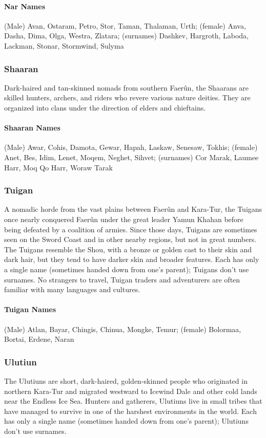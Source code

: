 \documentclass[10pt,a4paper,twoside,twocolumn,openany,bg=print,nodeprecatedcode]{dndbook}
\begin{document}
\paragraph{Nar Names}
(Male) Avan, Ostaram, Petro, Stor, Taman, Thalaman, Urth; (female) Anva, Dasha, Dima, Olga, Westra, Zlatara; (surnames) Dashkev, Hargroth, Laboda, Lackman, Stonar, Stormwind, Sulyma
\subsubsection{Shaaran}
Dark-haired and tan-skinned nomads from southern Faerûn, the Shaarans are skilled hunters, archers, and riders who revere various nature deities. They are organized into clans under the direction of elders and chieftains.
\paragraph{Shaaran Names}
(Male) Awar, Cohis, Damota, Gewar, Hapah, Laskaw, Senesaw, Tokhis; (female) Anet, Bes, Idim, Lenet, Moqem, Neghet, Sihvet; (surnames) Cor Marak, Laumee Harr, Moq Qo Harr, Woraw Tarak
\subsubsection{Tuigan}
A nomadic horde from the vast plains between Faerûn and Kara-Tur, the Tuigans once nearly conquered Faerûn under the great leader Yamun Khahan before being defeated by a coalition of armies. Since those days, Tuigans are sometimes seen on the Sword Coast and in other nearby regions, but not in great numbers.
The Tuigans resemble the Shou, with a bronze or golden cast to their skin and dark hair, but they tend to have darker skin and broader features. Each has only a single name (sometimes handed down from one's parent); Tuigans don't use surnames. No strangers to travel, Tuigan traders and adventurers are often familiar with many languages and cultures.
\paragraph{Tuigan Names}
(Male) Atlan, Bayar, Chingis, Chinua, Mongke, Temur; (female) Bolormaa, Bortai, Erdene, Naran
\subsubsection{Ulutiun}
The Ulutiuns are short, dark-haired, golden-skinned people who originated in northern Kara-Tur and migrated westward to Icewind Dale and other cold lands near the Endless Ice Sea. Hunters and gatherers, Ulutiuns live in small tribes that have managed to survive in one of the harshest environments in the world. Each has only a single name (sometimes handed down from one's parent); Ulutiuns don't use surnames.
\end{document}
